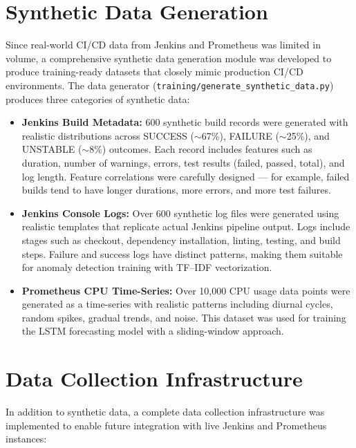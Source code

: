 \documentclass[12pt]{report}
\begin{document}
\section{Synthetic Data Generation}

Since real-world CI/CD data from Jenkins and Prometheus was limited in volume, a comprehensive synthetic data generation module was developed to produce training-ready datasets that closely mimic production CI/CD environments. The data generator (\texttt{training/generate\_synthetic\_data.py}) produces three categories of synthetic data:

\begin{itemize}
    \item \textbf{Jenkins Build Metadata:} 600 synthetic build records were generated with realistic distributions across SUCCESS ($\sim$67\%), FAILURE ($\sim$25\%), and UNSTABLE ($\sim$8\%) outcomes. Each record includes features such as duration, number of warnings, errors, test results (failed, passed, total), and log length. Feature correlations were carefully designed --- for example, failed builds tend to have longer durations, more errors, and more test failures.
    
    \item \textbf{Jenkins Console Logs:} Over 600 synthetic log files were generated using realistic templates that replicate actual Jenkins pipeline output. Logs include stages such as checkout, dependency installation, linting, testing, and build steps. Failure and success logs have distinct patterns, making them suitable for anomaly detection training with TF--IDF vectorization.
    
    \item \textbf{Prometheus CPU Time-Series:} Over 10,000 CPU usage data points were generated as a time-series with realistic patterns including diurnal cycles, random spikes, gradual trends, and noise. This dataset was used for training the LSTM forecasting model with a sliding-window approach.
\end{itemize}

\section{Data Collection Infrastructure}

In addition to synthetic data, a complete data collection infrastructure was implemented to enable future integration with live Jenkins and Prometheus instances:
\end{document}
